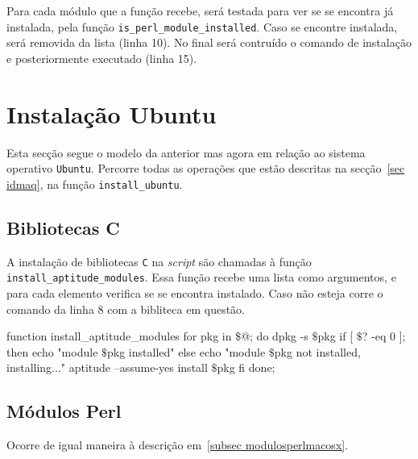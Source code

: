Para cada módulo que a função recebe, será testada para ver se se encontra já instalada, pela função \texttt{is\_perl\_module\_installed}. Caso se encontre instalada, será removida da
lista (linha 10). No final será contruído o comando de instalação e posteriormente executado (linha 15).

\section{Instalação Ubuntu}
Esta secção segue o modelo da anterior mas agora em relação ao sistema operativo \texttt{Ubuntu}. Percorre todas as operações que estão descritas na secção~\ref{sec idmaq}, na 
função \texttt{install\_ubuntu}.

\subsection{Bibliotecas C}
A instalação de bibliotecas \texttt{C} na \emph{script} são chamadas à função \texttt{install\_aptitude\_modules}. Essa função recebe uma lista como argumentos, e para cada elemento 
verifica se se encontra instalado. Caso não esteja corre o comando da linha 8 com a bibliteca em questão.\\

\begin{myxml}
function install_aptitude_modules {
        for pkg in $\$$@; do
                dpkg -s $\$$pkg
                if [ $\$$? -eq 0 ]; then
                        echo "module $\$$pkg installed"
                else
                        echo "module $\$$pkg not installed, installing..."
                        aptitude --assume-yes install $\$$pkg
                fi
        done;
}
\end{myxml}


\subsection{Módulos Perl}
Ocorre de igual maneira à descrição em~\ref{subsec modulosperlmacosx}.